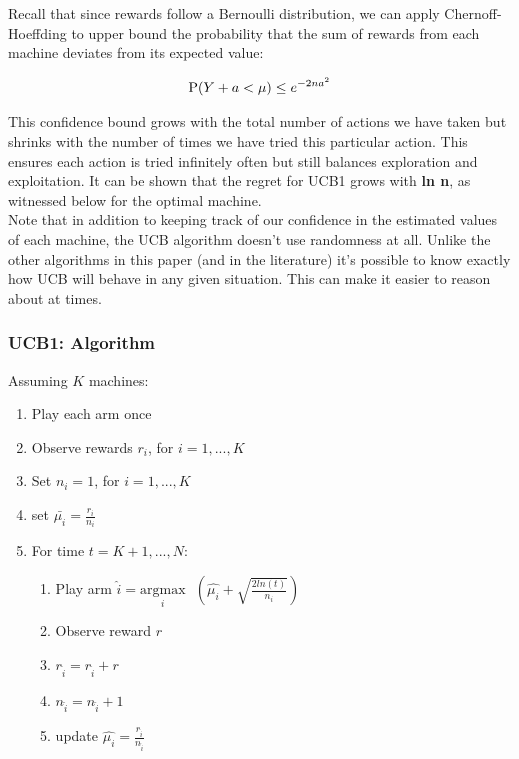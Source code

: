 \documentclass{article}
\begin{document}
Recall that since rewards follow a Bernoulli distribution, we can apply Chernoff-Hoeffding to upper bound the probability that the sum of rewards from each machine deviates from its expected value:

$$\displaystyle \textup{P}(Y + a < \mu) \leq e^{-2na^2}$$

This confidence bound grows with the total number of actions we have taken but shrinks with the number of times we have tried this particular action. This ensures each action is tried infinitely often but still balances exploration and exploitation. It can be shown that the regret for UCB1 grows with \textbf{ln n}, as witnessed below for the optimal machine.\\

Note that in addition to keeping track of our confidence in the estimated values of each machine, the UCB algorithm doesn’t use randomness at all. Unlike the other algorithms in this paper (and in the literature) it’s possible to know exactly how UCB will behave in any given situation. This can make it easier to reason about at times.

\subsubsection{UCB1: Algorithm}

Assuming $K$ machines:

\begin{enumerate}
\item Play each arm once
\item Observe rewards $r_i$, for $i = 1, ..., K$
\item Set $n_i = 1$, for $i = 1, ..., K$
\item set $\bar{\mu_{i}} = \frac{r_i}{n_i}$
\item For time $t = K+1, ..., N$:
	\begin{enumerate}
		\item Play arm $\hat{i} = \underset{i}{\text{argmax}}\text{ }(\hat{\mu_{i}} + \sqrt{\frac{2 ln (t)}{n_i}})$
		\item Observe reward $r$
		\item $r_{\hat{i}} = r_{\hat{i}} + r$
		\item $n_{\hat{i}} = n_{\hat{i}} + 1$
		\item update $\hat{\mu_{i}} = \frac{r_{\hat{i}}}{n_{\hat{i}}}$
	\end{enumerate}
\end{enumerate}
\end{document}
